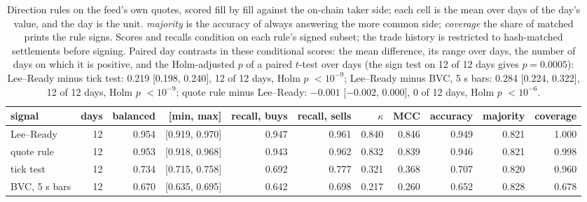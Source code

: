 \begin{table}[htbp]
\centering\scriptsize\setlength{\tabcolsep}{3.5pt}
\begin{tabular}{lrrrrrrrrrr}
\toprule
signal & days & balanced & [min, max] & recall, buys & recall, sells & $\kappa$ & MCC & accuracy & majority & coverage \\
\midrule
Lee--Ready & 12 & 0.954 & [0.919, 0.970] & 0.947 & 0.961 & 0.840 & 0.846 & 0.949 & 0.821 & 1.000 \\
quote rule & 12 & 0.953 & [0.918, 0.968] & 0.943 & 0.962 & 0.832 & 0.839 & 0.946 & 0.821 & 0.998 \\
tick test & 12 & 0.734 & [0.715, 0.758] & 0.692 & 0.777 & 0.321 & 0.368 & 0.707 & 0.820 & 0.960 \\
BVC, 5 s bars & 12 & 0.670 & [0.635, 0.695] & 0.642 & 0.698 & 0.217 & 0.260 & 0.652 & 0.828 & 0.678 \\
\bottomrule
\end{tabular}
\caption{Direction rules on the feed's own quotes, scored fill by fill against the on-chain taker side; each cell is the mean over days of the day's value, and the day is the unit. \emph{majority} is the accuracy of always answering the more common side; \emph{coverage} the share of matched prints the rule signs. Scores and recalls condition on each rule's signed subset; the trade history is restricted to hash-matched settlements before signing. Paired day contrasts in these conditional scores: the mean difference, its range over days, the number of days on which it is positive, and the Holm-adjusted $p$ of a paired $t$-test over days (the sign test on 12 of 12 days gives $p=0.0005$): Lee--Ready minus tick test: 0.219 [0.198, 0.240], 12 of 12 days, Holm $p$ $<10^{-9}$; Lee--Ready minus BVC, 5 s bars: 0.284 [0.224, 0.322], 12 of 12 days, Holm $p$ $<10^{-9}$; quote rule minus Lee--Ready: $-0.001$ [$-0.002$, 0.000], 0 of 12 days, Holm $p$ $<10^{-6}$.}
\label{tab:direction}
\end{table}
